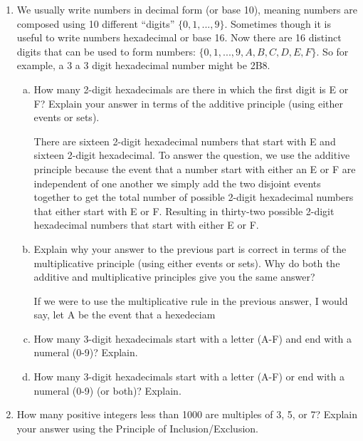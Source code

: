 \documentclass[11pt, a4paper]{article}
\newcommand\setItemNumber[1]{\setcounter{enumi}{\numexpr#1-1\relax}}
\begin{document}
    \begin{enumerate} 
    
        \setItemNumber{4}
        \item We usually write numbers in decimal form (or base 10), meaning numbers are composed using 10 different “digits” $\{0,1,...,9\}$. Sometimes though it is useful to write numbers hexadecimal or base 16. Now there are 16 distinct digits that can be used to form numbers: $\{0,1,...,9,A,B,C,D,E,F\}$. So for example, a 3 a 3 digit hexadecimal number might be 2B8.
        \begin{enumerate}[(a)]

            \item How many 2-digit hexadecimals are there in which the first digit is E or F? Explain your answer in terms of the additive principle (using either events or sets).
            
            There are sixteen 2-digit hexadecimal numbers that start with E and sixteen 2-digit hexadecimal. To answer the question, we use the additive principle because the event that a number start with either an E or F are independent of one another we simply add the two disjoint events together to get the total number of possible 2-digit hexadecimal numbers that either start with E or F. Resulting in thirty-two possible 2-digit hexadecimal numbers that start with either E or F.

            \item Explain why your answer to the previous part is correct in terms of the multiplicative principle (using either events or sets). Why do both the additive and multiplicative principles give you the same answer?

                If we were to use the multiplicative rule in the previous answer, I would say, let A be the event that a hexedeciam 

            \item How many 3-digit hexadecimals start with a letter (A-F) and end with a numeral (0-9)? Explain.

            \item How many 3-digit hexadecimals start with a letter (A-F) or end with a numeral (0-9) (or both)? Explain.

        \end{enumerate}

        \setItemNumber{10}
        \item How many positive integers less than 1000 are multiples of 3, 5, or 7? Explain your answer using the Principle of Inclusion/Exclusion.

    \end{enumerate}
	
\end{document}
